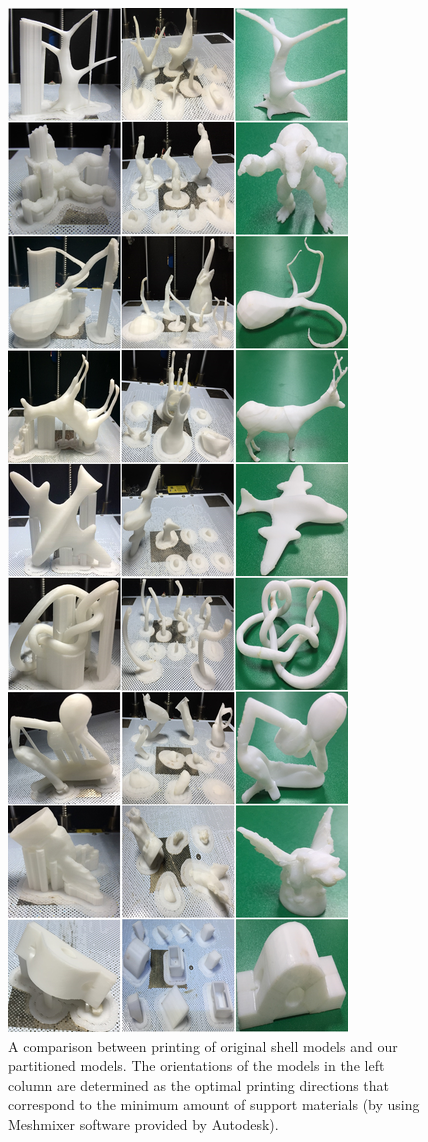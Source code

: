 \begin{figure}[t]
  \centering
  \includegraphics[width=0.908\linewidth]{figs/experiment.png}
  \caption{\label{fig:experiment}%
           A comparison between printing of original shell models and our partitioned models. The orientations of the models in the left column are determined as the optimal printing directions that correspond to the minimum amount of support materials (by using Meshmixer software provided by Autodesk). }
\end{figure}

